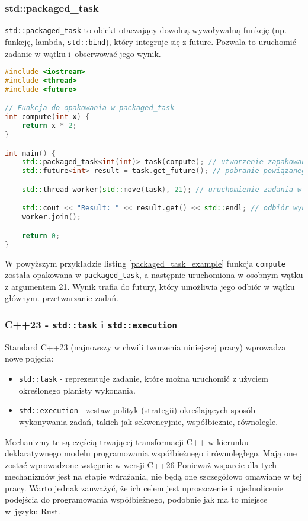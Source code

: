 \subsubsection{std::packaged\_task}
\texttt{std::packaged\_task} to obiekt otaczający dowolną wywoływalną funkcję (np. funkcję, lambda, \texttt{std::bind}), który integruje się z future. Pozwala to uruchomić zadanie w wątku i~obserwować jego wynik.
\begin{lstlisting}[language=C++, style=VS2017,  caption={Przykład użycia std::packaged\_task}, label={packaged_task_example}]
#include <iostream>
#include <thread>
#include <future>

// Funkcja do opakowania w packaged_task
int compute(int x) {
    return x * 2;
}

int main() {
    std::packaged_task<int(int)> task(compute); // utworzenie zapakowanego zadania
    std::future<int> result = task.get_future(); // pobranie powiązanego future

    std::thread worker(std::move(task), 21); // uruchomienie zadania w wątku z parametrem 21

    std::cout << "Result: " << result.get() << std::endl; // odbiór wyniku
    worker.join();

    return 0;
}
\end{lstlisting}
W powyższym przykładzie listing \ref{packaged_task_example} funkcja \texttt{compute} została opakowana w \texttt{packaged\_task}, a następnie uruchomiona w osobnym wątku z argumentem 21. Wynik trafia do futury, który umożliwia jego odbiór w wątku głównym. przetwarzanie zadań.

\subsubsection{C++23 - \texttt{std::task} i \texttt{std::execution}}
Standard C++23 (najnowszy w chwili tworzenia niniejszej pracy) wprowadza nowe pojęcia:
\begin{itemize}
    \item \texttt{std::task} - reprezentuje zadanie, które można uruchomić z użyciem określonego planisty wykonania.
    \item \texttt{std::execution} - zestaw polityk (strategii) określających sposób wykonywania zadań, takich jak sekwencyjnie, współbieżnie, równolegle.
\end{itemize}

Mechanizmy te są częścią trwającej transformacji C++ w kierunku deklaratywnego modelu programowania współbieżnego i równoległego. Mają one zostać wprowadzone wstępnie w wersji C++26 \cite{cpp26} Ponieważ wsparcie dla tych mechanizmów jest na etapie wdrażania, nie będą one szczegółowo omawiane w tej pracy. Warto jednak zauważyć, że ich celem jest uproszczenie i~ujednolicenie podejścia do programowania współbieżnego, podobnie jak ma to miejsce w~języku Rust.